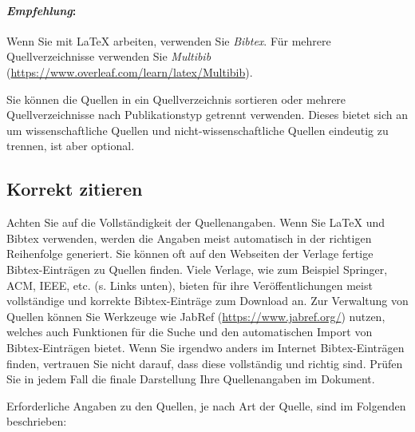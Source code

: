 \paragraph{\textit{Empfehlung}:}
Wenn Sie mit \LaTeX{} arbeiten, verwenden Sie \textit{Bibtex}. Für mehrere Quellverzeichnisse verwenden Sie \textit{Multibib} (\url{https://www.overleaf.com/learn/latex/Multibib}).

Sie können die Quellen in ein Quellverzeichnis sortieren oder mehrere Quellverzeichnisse nach Publikationstyp getrennt verwenden. Dieses bietet sich an um wissenschaftliche Quellen und nicht-wissenschaftliche Quellen eindeutig zu trennen, ist aber optional.

\subsection{Korrekt zitieren}

Achten Sie auf die Vollständigkeit der Quellenangaben. Wenn Sie \LaTeX{} und Bibtex verwenden, werden die Angaben meist automatisch in der richtigen Reihenfolge generiert. Sie können oft auf den Webseiten der Verlage fertige Bibtex-Einträgen zu Quellen finden. Viele Verlage, wie zum Beispiel Springer, ACM, IEEE, etc. (s. Links unten), bieten für ihre Veröffentlichungen meist vollständige und korrekte Bibtex-Einträge zum Download an. Zur Verwaltung von Quellen können Sie Werkzeuge wie JabRef (\url{https://www.jabref.org/}) nutzen, welches auch Funktionen für die Suche und den automatischen Import von Bibtex-Einträgen bietet. Wenn Sie irgendwo anders im Internet Bibtex-Einträgen finden, vertrauen Sie nicht darauf, dass diese vollständig und richtig sind. Prüfen Sie in jedem Fall die finale Darstellung Ihre Quellenangaben im Dokument. 

Erforderliche Angaben zu den Quellen, je nach Art der Quelle, sind im Folgenden beschrieben:

